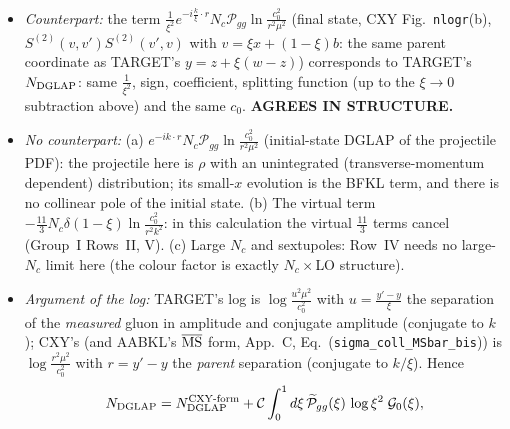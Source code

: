\begin{itemize}
\item \emph{Counterpart:} the term $\frac{1}{\xi^{2}}e^{-i\frac{k}{\xi}\cdot r}N_{c}\mathcal{P}_{gg}\ln\frac{c_{0}^{2}}{r^{2}\mu^{2}}$ (final state, CXY Fig.~\texttt{nlogr}(b), $S^{(2)}(v,v')S^{(2)}(v',v)$ with $v=\xi x+(1-\xi)b$: the same parent coordinate as TARGET's $y=z+\xi(w-z)$) corresponds to TARGET's $N_{\rm DGLAP}$: same $\frac{1}{\xi^{2}}$, sign, coefficient, splitting function (up to the $\xi\to0$ subtraction above) and the same $c_{0}$. \textbf{AGREES IN STRUCTURE.}
\item \emph{No counterpart:} (a) $e^{-ik\cdot r}N_{c}\mathcal{P}_{gg}\ln\frac{c_{0}^{2}}{r^{2}\mu^{2}}$ (initial-state DGLAP of the projectile PDF): the projectile here is $\rho$ with an unintegrated (transverse-momentum dependent) distribution; its small-$x$ evolution is the BFKL term, and there is no collinear pole of the initial state. (b) The virtual term $-\frac{11}{3}N_{c}\delta(1-\xi)\ln\frac{c_{0}^{2}}{r^{2}k^{2}}$: in this calculation the virtual $\frac{11}{3}$ terms cancel (Group~I Rows~II, V). (c) Large $N_{c}$ and sextupoles: Row~IV needs no large-$N_{c}$ limit here (the colour factor is exactly $N_{c}\times$LO structure).
\item \emph{Argument of the log:} TARGET's log is $\log\frac{u^{2}\mu^{2}}{c_{0}^{2}}$ with $u=\frac{y'-y}{\xi}$ the separation of the \emph{measured} gluon in amplitude and conjugate amplitude (conjugate to $k$); CXY's (and AABKL's $\overline{\rm MS}$ form, App.~C, Eq.~(\texttt{sigma\_coll\_MSbar\_bis})) is $\log\frac{r^{2}\mu^{2}}{c_{0}^{2}}$ with $r=y'-y$ the \emph{parent} separation (conjugate to $k/\xi$). Hence
\begin{equation}
N_{\rm DGLAP}=N_{\rm DGLAP}^{\rm CXY\text{-}form}+\mathcal{C}\int_{0}^{1}d\xi\,\widetilde{\mathcal P}_{gg}(\xi)\,\log\xi^{2}\;\mathcal{G}_{0}(\xi),
\end{equation}

\end{itemize}
